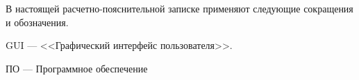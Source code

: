 
В настоящей расчетно-пояснительной записке применяют следующие сокращения и обозначения.\\

\begin{description}	
	\item{GUI} --- <<Графический интерфейс пользователя>>.
	\item{ПО} --- Программное обеспечение
\end{description}
